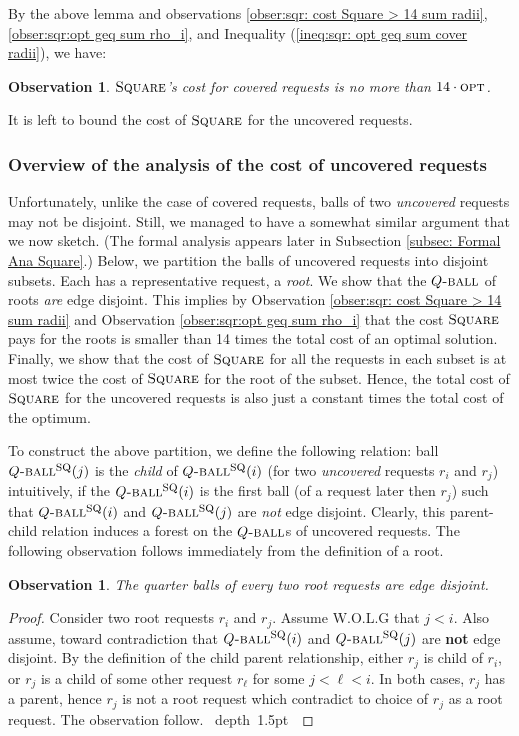 \documentclass[11pt]{article}
\newtheorem{observation}[theorem]{Observation}
\def\blackslug{\hbox{\hskip 1pt \vrule width 4pt height 8pt
    depth 1.5pt \hskip 1pt}}
\def\QED{\quad\blackslug\lower 8.5pt\null\par}
\newcommand{\opt}{\mbox{\textsc{opt}}}
\newcommand{\Square}[0]{\mbox{\sc Square}}
\newcommand{\SQball}[0]{Q{\mbox{\sc -ball}}^{\mbox{\sc sq}}}
\newcommand{\Qball}[0]{Q{\mbox{\sc -ball}}}
\begin{document}
By the above lemma and observations \ref{obser:sqr: cost Square > 14 sum radii}, \ref{obser:sqr:opt geq sum rho_i},
and Inequality (\ref{ineq:sqr: opt geq sum cover radii}), we have:

\begin{observation}
\label{obs:covered}
$\Square$'s cost for covered requests is no more than $14\cdot\opt$.
\end{observation}
\vspace{0.3cm}
\noindent It is left to bound the cost of $\Square$ for the uncovered requests.




\subsubsection{Overview of the analysis of the cost of uncovered requests}

Unfortunately, unlike the case of covered requests, balls of two {\em uncovered} requests may not be disjoint.
Still, we managed to have a somewhat similar argument that we now sketch.
(The formal analysis appears later in Subsection \ref{subsec: Formal Ana Square}.)
Below, we partition the balls of uncovered requests into disjoint subsets.
Each has a representative request, a {\em root}.
We show that the $\Qball$ of roots {\em are} edge disjoint.
This implies by Observation \ref{obser:sqr: cost Square > 14 sum radii} and Observation \ref{obser:sqr:opt geq sum rho_i}
that the cost $\Square$ pays for the roots is smaller than 14 times the total cost of an optimal solution.
Finally, we show that the cost of $\Square$ for all the requests in each subset is at most twice the cost of $\Square$  for the root of the subset.
Hence, the total cost of $\Square$ for the uncovered requests is also just a constant times the total cost of the optimum.


To construct the above partition, we define the following relation:
ball $\SQball(j)$ is the {\em child} of $\SQball(i)$ (for two {\em uncovered} requests $r_i$ and $r_j$) intuitively,
if the $\SQball(i)$ is the first ball (of a request later then $r_j$) such that $\SQball(i)$ and $\SQball(j)$ are {\em not} edge disjoint.
Clearly, this parent-child relation induces a forest on the $\Qball$s of uncovered requests.
The following observation follows immediately from the definition of a root.

\begin{observation}
\label{obs:roots-distjoint}
The quarter balls of every two root requests are edge disjoint.
\end{observation}
\begin{proof}
Consider two root requests $r_i$ and $r_j$. Assume W.O.L.G that $j<i$.
Also assume, toward contradiction that $\SQball(i)$ and $\SQball(j)$ are {\bf not} edge disjoint.
By the definition of the child parent relationship, either $r_j$ is child of $r_i$, or $r_j$ is a child of some other request $r_{\ell}$ for some $j<\ell<i$.
In both cases, $r_j$ has a parent, hence $r_j$ is not a root request which contradict to choice of $r_j$ as a root request.
The observation follow.
\QED
\end{proof}
\end{document}
